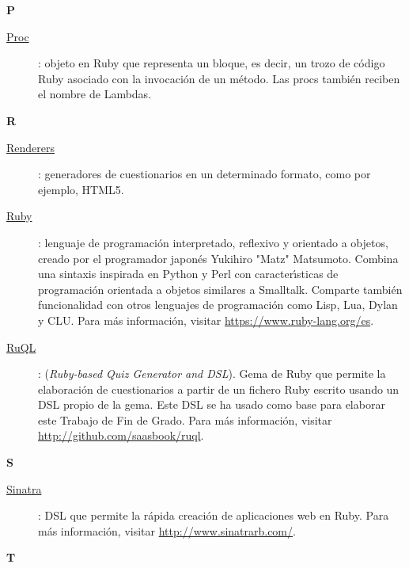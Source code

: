 {\bfseries {\Huge P}}\label{Apendice1:P}
\bigskip
\bigskip

\begin{description}
  \item[\underline{Proc}\label{apend1:proc}]: objeto en Ruby que representa un bloque, es decir, un trozo de c\'odigo Ruby asociado con la invocaci\'on de un m\'etodo. Las procs tambi\'en reciben 
el nombre
  de Lambdas.
\end{description}

\bigskip
{\bfseries {\Huge R}}\label{Apendice1:R}
\bigskip
\bigskip

\begin{description}
  \item[\underline{Renderers}\label{apend1:renderer}]: generadores de cuestionarios en un determinado formato, como por ejemplo, HTML5.
  \bigskip

  \item[\underline{Ruby}\label{apend1:ruby}]: lenguaje de programaci\'on interpretado, reflexivo y orientado a objetos, creado por el programador japon\'es Yukihiro "Matz" 
  Matsumoto. Combina una sintaxis inspirada en Python y Perl con caracter\'{\i}sticas de programaci\'on orientada a objetos similares a Smalltalk. Comparte tambi\'en funcionalidad con otros lenguajes 
  de programaci\'on como Lisp, Lua, Dylan y CLU. Para m\'as informaci\'on, visitar {\small \url{https://www.ruby-lang.org/es}}.
  \bigskip

  \item[\underline{RuQL}\label{apend1:ruql}]: (\textit{Ruby-based Quiz Generator and DSL}). Gema de Ruby que permite la elaboraci\'on de cuestionarios a partir de un fichero Ruby
  escrito usando un DSL propio de la gema. Este DSL se ha usado como base para elaborar este Trabajo de Fin de Grado. Para m\'as informaci\'on, visitar {\small \url{http://github.com/saasbook/ruql}}.
  \bigskip
\end{description}

\bigskip
{\bfseries {\Huge S}}\label{Apendice1:S}
\bigskip
\bigskip

\begin{description}
  \item[\underline{Sinatra}\label{apend1:sinatra}]: DSL que permite la r\'apida creaci\'on de aplicaciones web en Ruby. Para m\'as informaci\'on, visitar {\small \url{http://www.sinatrarb.com/}}.
  \bigskip
\end{description}
\newpage

{\bfseries {\Huge T}}\label{Apendice1:T}
\bigskip
\bigskip

